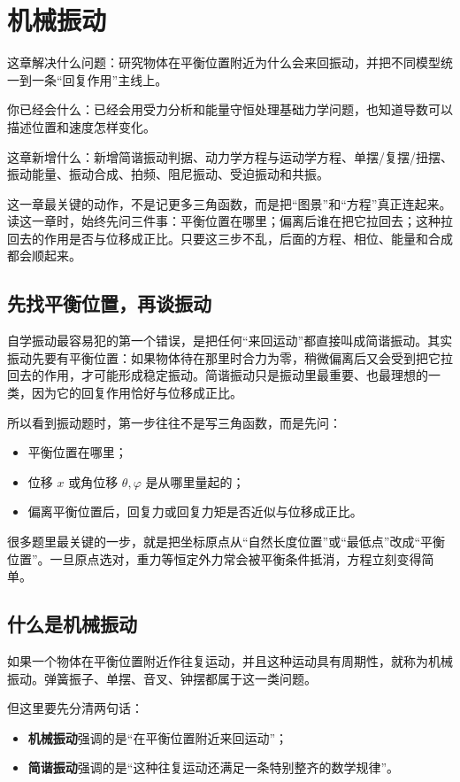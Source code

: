 \documentclass[lang=cn,11pt]{elegantbook}
\newcommand{\bridge}[1]{\begin{note}#1\end{note}}
\newcommand{\chapterroadmap}[3]{%
\begin{introduction}
  \item {\heiti 这章解决什么问题：}#1
  \item {\heiti 你已经会什么：}#2
  \item {\heiti 这章新增什么：}#3
\end{introduction}}
\begin{document}
\chapter{机械振动}

\chapterroadmap
{研究物体在平衡位置附近为什么会来回振动，并把不同模型统一到一条“回复作用”主线上。}
{已经会用受力分析和能量守恒处理基础力学问题，也知道导数可以描述位置和速度怎样变化。}
{新增简谐振动判据、动力学方程与运动学方程、单摆/复摆/扭摆、振动能量、振动合成、拍频、阻尼振动、受迫振动和共振。}

\bridge{这一章最关键的动作，不是记更多三角函数，而是把“图景”和“方程”真正连起来。读这一章时，始终先问三件事：平衡位置在哪里；偏离后谁在把它拉回去；这种拉回去的作用是否与位移成正比。只要这三步不乱，后面的方程、相位、能量和合成都会顺起来。}

\section{先找平衡位置，再谈振动}

自学振动最容易犯的第一个错误，是把任何“来回运动”都直接叫成简谐振动。其实振动先要有平衡位置：如果物体待在那里时合力为零，稍微偏离后又会受到把它拉回去的作用，才可能形成稳定振动。简谐振动只是振动里最重要、也最理想的一类，因为它的回复作用恰好与位移成正比。

所以看到振动题时，第一步往往不是写三角函数，而是先问：
\begin{itemize}
  \item 平衡位置在哪里；
  \item 位移 \(x\) 或角位移 \(\theta,\varphi\) 是从哪里量起的；
  \item 偏离平衡位置后，回复力或回复力矩是否近似与位移成正比。
\end{itemize}

\begin{note}
很多题里最关键的一步，就是把坐标原点从“自然长度位置”或“最低点”改成“平衡位置”。一旦原点选对，重力等恒定外力常会被平衡条件抵消，方程立刻变得简单。
\end{note}

\section{什么是机械振动}

如果一个物体在平衡位置附近作往复运动，并且这种运动具有周期性，就称为机械振动。弹簧振子、单摆、音叉、钟摆都属于这一类问题。

但这里要先分清两句话：
\begin{itemize}
  \item \textbf{机械振动}强调的是“在平衡位置附近来回运动”；
  \item \textbf{简谐振动}强调的是“这种往复运动还满足一条特别整齐的数学规律”。
\end{itemize}
\end{document}
